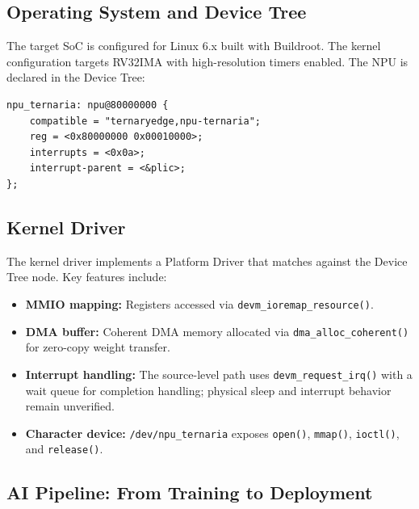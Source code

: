 \documentclass[10pt,conference]{IEEEtran}
\begin{document}
\subsection{Operating System and Device Tree}
\label{sec:os}


The target SoC is configured for Linux 6.x built with Buildroot. The kernel configuration targets RV32IMA with high-resolution timers enabled. The NPU is declared in the Device Tree:

\begin{verbatim}
npu_ternaria: npu@80000000 {
    compatible = "ternaryedge,npu-ternaria";
    reg = <0x80000000 0x00010000>;
    interrupts = <0x0a>;
    interrupt-parent = <&plic>;
};
\end{verbatim}

\subsection{Kernel Driver}
\label{sec:driver}


The kernel driver implements a Platform Driver that matches against the Device Tree node. Key features include:

\begin{itemize}
    \item \textbf{MMIO mapping:} Registers accessed via \texttt{devm\_ioremap\_resource()}.
    \item \textbf{DMA buffer:} Coherent DMA memory allocated via \texttt{dma\_alloc\_coherent()} for zero-copy weight transfer.
    \item \textbf{Interrupt handling:} The source-level path uses \texttt{devm\_request\_irq()} with a wait queue for completion handling; physical sleep and interrupt behavior remain unverified.
    \item \textbf{Character device:} \texttt{/dev/npu\_ternaria} exposes \texttt{open()}, \texttt{mmap()}, \texttt{ioctl()}, and \texttt{release()}.
\end{itemize}

\subsection{AI Pipeline: From Training to Deployment}
\label{sec:ai}

\end{document}
